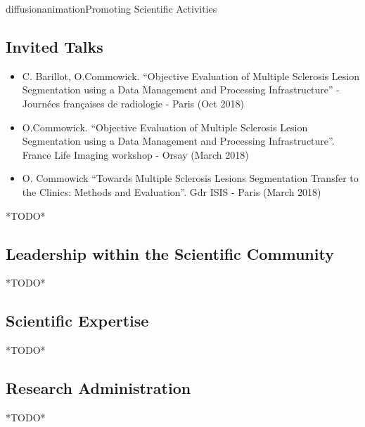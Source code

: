 \documentclass{ra2018}
\begin{document}
\begin{module}{diffusion}{animation}{Promoting Scientific Activities}
\subsection{Invited Talks}
\begin{itemize}
    \item C. Barillot, O.Commowick. ``Objective Evaluation of Multiple Sclerosis Lesion Segmentation using a Data Management and Processing Infrastructure'' - Journées françaises de radiologie - Paris (Oct 2018)~\cite{commowick:inserm-01895603}
    \item O.Commowick. ``Objective Evaluation of Multiple Sclerosis Lesion Segmentation using a Data Management and Processing Infrastructure''. France Life Imaging workshop - Orsay (March 2018)
    \item O. Commowick ``Towards Multiple Sclerosis Lesions Segmentation Transfer to the Clinics: Methods and Evaluation''. Gdr ISIS - Paris (March 2018)
\end{itemize}


*TODO*
\subsection{Leadership within the Scientific Community}
*TODO*
\subsection{Scientific Expertise}
*TODO*
\subsection{Research Administration}
*TODO*
  
\end{module}
\end{document}
